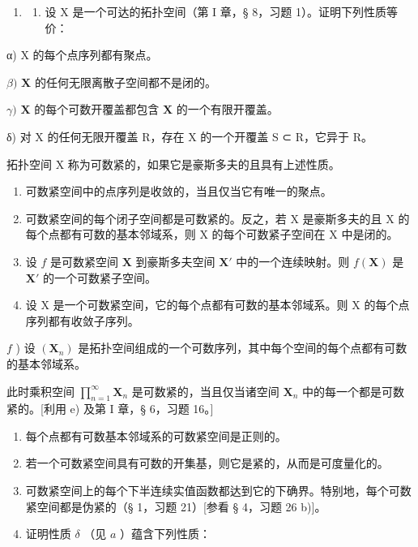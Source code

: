 \begin{enumerate}
\def\labelenumi{\arabic{enumi})}
\setcounter{enumi}{13}
\tightlist
\item
  \begin{enumerate}
  \def\labelenumii{\alph{enumii})}
  \tightlist
  \item
    设 X 是一个可达的拓扑空间（第 I 章，§ 8，习题 1）。证明下列性质等价：
  \end{enumerate}
\end{enumerate}

α) X 的每个点序列都有聚点。

\(\beta)\) \(\mathbf{X}\) 的任何无限离散子空间都不是闭的。

\(\gamma)\) \(\mathbf{X}\) 的每个可数开覆盖都包含 \(\mathbf{X}\) 的一个有限开覆盖。

δ) 对 X 的任何无限开覆盖 R，存在 X 的一个开覆盖 S ⊂ R，它异于 R。

拓扑空间 X 称为可数紧的，如果它是豪斯多夫的且具有上述性质。

\begin{enumerate}
\def\labelenumi{\alph{enumi})}
\setcounter{enumi}{1}
\item
  可数紧空间中的点序列是收敛的，当且仅当它有唯一的聚点。
\item
  可数紧空间的每个闭子空间都是可数紧的。反之，若 X 是豪斯多夫的且 X 的每个点都有可数的基本邻域系，则 X 的每个可数紧子空间在 X 中是闭的。
\item
  设 \(f\) 是可数紧空间 \(\mathbf{X}\) 到豪斯多夫空间 \(\mathbf{X}'\) 中的一个连续映射。则 \(f(\mathbf{X})\) 是 \(\mathbf{X}'\) 的一个可数紧子空间。
\item
  设 X 是一个可数紧空间，它的每个点都有可数的基本邻域系。则 X 的每个点序列都有收敛子序列。
\end{enumerate}

\(f\) ) 设 \((\mathbf{X}_n)\) 是拓扑空间组成的一个可数序列，其中每个空间的每个点都有可数的基本邻域系。

此时乘积空间 \(\prod_{n=1}^{\infty} \mathbf{X}_n\) 是可数紧的，当且仅当诸空间 \(\mathbf{X}_n\) 中的每一个都是可数紧的。{[}利用 e) 及第 I 章，§ 6，习题 16。{]}

\begin{enumerate}
\def\labelenumi{\alph{enumi})}
\setcounter{enumi}{6}
\item
  每个点都有可数基本邻域系的可数紧空间是正则的。
\item
  若一个可数紧空间具有可数的开集基，则它是紧的，从而是可度量化的。
\item
  可数紧空间上的每个下半连续实值函数都达到它的下确界。特别地，每个可数紧空间都是伪紧的（§ 1，习题 21）{[}参看 § 4，习题 26 b){]}。
\item
  证明性质 \(\delta\) （见 \(a\) ）蕴含下列性质：
\end{enumerate}

